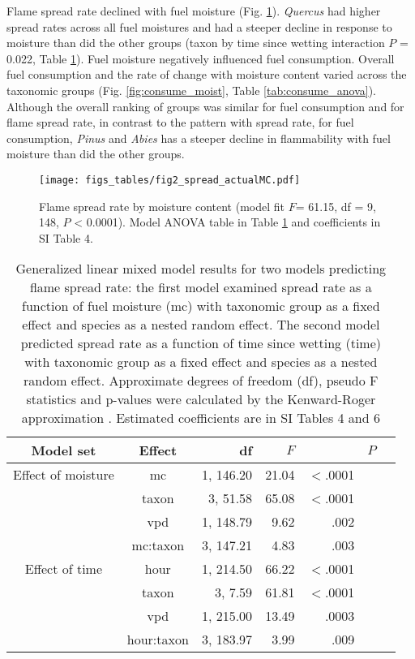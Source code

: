 \documentclass[letterpaper,12pt]{article}
\begin{document}
Flame spread rate declined with fuel moisture (Fig. \ref{fig:spread_moist}).
\emph{Quercus} had higher spread rates across all fuel moistures and had a
steeper decline in response to moisture than did the other groups (taxon by
time since wetting interaction $P$ = 0.022, Table \ref{tab:spreadrate_anova}).
Fuel moisture negatively influenced fuel consumption. Overall fuel consumption
and the rate of change with moisture content varied across the taxonomic groups
(Fig. \ref{fig:consume_moist}, Table \ref{tab:consume_anova}). Although the
overall ranking of groups was similar for fuel consumption and for flame spread
rate, in contrast to the pattern with spread rate, for fuel consumption,
\emph{Pinus} and \emph{Abies} has a steeper decline in flammability with fuel
moisture than did the other groups.

\begin{figure}[h]
  \centering
\texttt{[image: figs\_tables/fig2\_spread\_actualMC.pdf]}
\caption{Flame spread rate by moisture content (model fit $F$= 61.15, df = 9,
  148, $P$ < 0.0001). Model ANOVA table in Table \ref{tab:spreadrate_anova} and
  coefficients in SI Table 4.}
  \label{fig:spread_moist}
\end{figure}

\begin{table}[h]
  \caption{Generalized linear mixed model results for two models predicting
    flame spread rate: the first model examined spread rate as a function of
    fuel moisture (mc) with taxonomic group as a fixed effect and species as a
    nested random effect. The second model predicted spread rate as a function
    of time since wetting (time) with taxonomic group as a fixed effect and
    species as a nested random effect. Approximate degrees of freedom (df),
    pseudo F statistics and p-values were calculated by the Kenward-Roger
    approximation \citep{Kenward_Roger-1997}. Estimated coefficients are in SI
    Tables 4 and 6}
  \label{tab:spreadrate_anova}
  
\centering
\begin{tabular}{ccrrrrr}
  \toprule
Model set & Effect & df & $F$ & & $P$ \\
  \midrule
  Effect of moisture & mc & 1, 146.20 & 21.04 & $<$.0001 \\ 
 & taxon & 3, 51.58 & 65.08 & $<$.0001 \\ 
 & vpd & 1, 148.79 & 9.62 & .002 \\ 
 & mc:taxon & 3, 147.21 & 4.83 & .003 \\ 
   
  \midrule
  
  Effect of time & hour & 1, 214.50 & 66.22 & $<$.0001 \\ 
 &  taxon & 3, 7.59 & 61.81 & $<$.0001 \\ 
 & vpd & 1, 215.00 & 13.49 & .0003 \\ 
 & hour:taxon & 3, 183.97 & 3.99 & .009 \\ 

   \bottomrule

\end{tabular}
\end{table}
\end{document}
